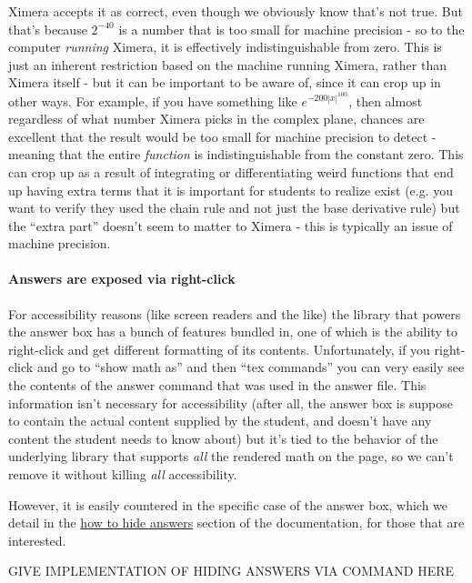 \documentclass{ximera}
\begin{document}
Ximera accepts it as correct, even though we obviously know that's not
true. But that's because $2^{-40}$ is a number that is too small for machine
precision - so to the computer \textit{running} Ximera, it is effectively
indistinguishable from zero. This is just an inherent restriction based on the
machine running Ximera, rather than Ximera itself - but it can be important to
be aware of, since it can crop up in other ways. For example, if you have
something like $e^{-200|x|^{100}}$, then almost regardless of what number
Ximera picks in the complex plane, chances are excellent that the result would
be too small for machine precision to detect - meaning that the entire
\textit{function} is indistinguishable from the constant zero. This can crop up
as a result of integrating or differentiating weird functions that end up
having extra terms that it is important for students to realize exist (e.g. you
want to verify they used the chain rule and not just the base derivative rule)
but the ``extra part'' doesn't seem to matter to Ximera - this is typically an
issue of machine precision.

\paragraph{Answers are exposed via right-click}

For accessibility reasons (like screen readers and the like) the library
that powers the answer box has a bunch of features bundled in, one of which is
the ability to right-click and get different formatting of its contents.
Unfortunately, if you right-click and go to ``show math as'' and then ``tex
commands'' you can very easily see the contents of the answer command that was
used in the answer file. This information isn't necessary for accessibility
(after all, the answer box is suppose to contain the actual content supplied by
the student, and doesn't have any content the student needs to know about) but
it's tied to the behavior of the underlying library that supports \textit{all}
the rendered math on the page, so we can't remove it without killing
\textit{all} accessibility.

However, it is easily countered in the specific case of the answer box,
which we detail in the
\href{https://xronos.clas.ufl.edu/examples/exampleCore/supplemental/hiddenAnswers}{how
  to hide answers} section of the documentation, for those that are interested.

GIVE IMPLEMENTATION OF HIDING ANSWERS VIA COMMAND HERE
\end{document}
